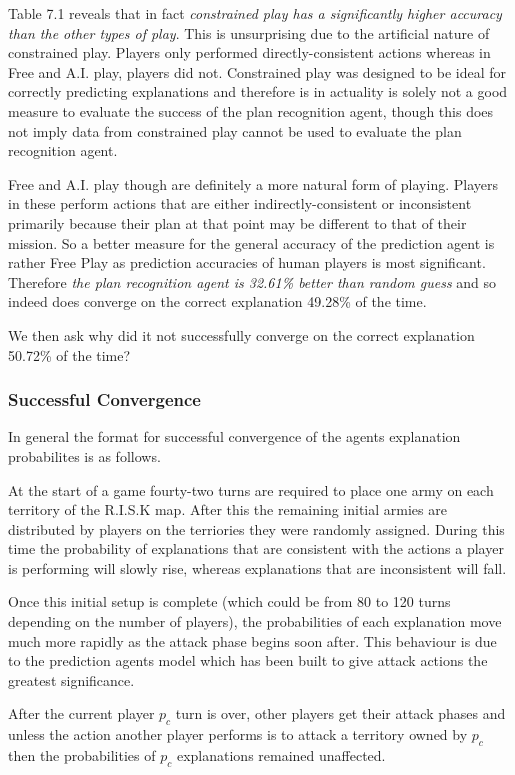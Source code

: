 \documentclass[parskip]{cs4rep}
\begin{document}
Table 7.1 reveals that in fact \textit{constrained play has a significantly higher accuracy than the other types of play}. This is unsurprising due to the artificial nature of constrained play. Players only performed directly-consistent actions whereas in Free and A.I. play, players did not. Constrained play was designed to be ideal for correctly predicting explanations and therefore is in actuality is solely not a good measure to evaluate the success of the plan recognition agent, though this does not imply data from constrained play cannot be used to evaluate the plan recognition agent.

Free and A.I. play though are definitely a more natural form of playing. Players in these perform actions that are either indirectly-consistent or inconsistent  primarily because their plan at that point may be different to that of their mission. So a better measure for the general accuracy of the prediction agent is rather Free Play as prediction accuracies of human players is most significant. Therefore \textit{the plan recognition agent is 32.61\% better than random guess} and so indeed does converge on the correct explanation 49.28\% of the time.

We then ask why did it not successfully converge on the correct explanation 50.72\% of the time? 

\subsubsection{Successful Convergence}

In general the format for successful convergence of the agents explanation probabilites is as follows.

At the start of a game fourty-two turns are required to place one army on each territory of the R.I.S.K map. After this the remaining initial armies are distributed by players on the terriories they were randomly assigned. During this time the probability of explanations that are consistent with the actions a player is performing will slowly rise, whereas explanations that are inconsistent will fall.

Once this initial setup is complete (which could be from 80 to 120 turns depending on the number of players), the probabilities of each explanation move much more rapidly as the attack phase begins soon after. This behaviour is due to the prediction agents model which has been built to give attack actions the greatest significance.

After the current player $p_c$ turn is over, other players get their attack phases and unless the action another player performs is to attack a territory owned by $p_c$ then the probabilities of $p_c$ explanations remained unaffected. 
\end{document}
